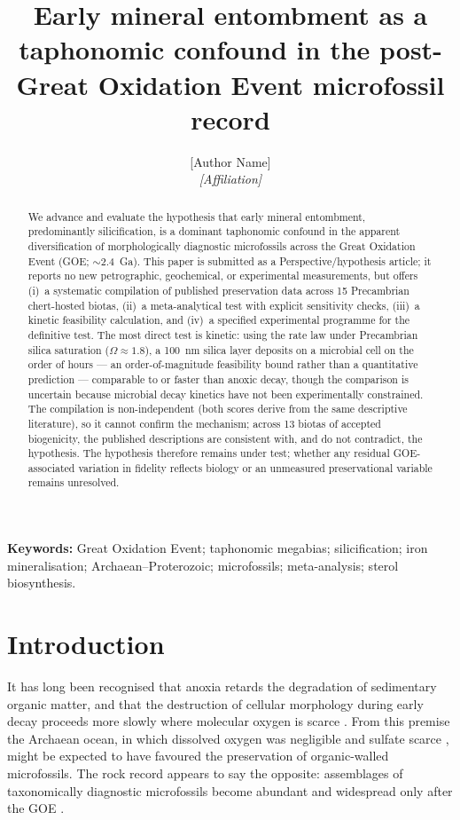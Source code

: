 \documentclass[11pt]{article}
\title{\vspace{-1.0cm}\textbf{Early mineral entombment as a taphonomic confound in the
post-Great Oxidation Event microfossil record}}
\author{[Author Name]\\
\small\textit{[Affiliation]}}
\date{}
\begin{document}
\maketitle

\begin{abstract}
\noindent We advance and evaluate the hypothesis that early mineral entombment, predominantly
silicification, is a dominant taphonomic confound in the apparent diversification of morphologically
diagnostic microfossils across the Great Oxidation Event (GOE; $\sim$2.4~Ga). This paper is submitted
as a Perspective/hypothesis article; it reports no new petrographic, geochemical, or experimental
measurements, but offers (i)~a systematic compilation of published preservation data across 15
Precambrian chert-hosted biotas, (ii)~a meta-analytical test with explicit sensitivity checks,
(iii)~a kinetic feasibility calculation, and (iv)~a specified experimental programme for the
definitive test. The most direct test is kinetic: using the \citet{Rimstidt1980} rate law under
Precambrian silica saturation ($\Omega \approx 1.8$), a 100~nm silica layer deposits on a microbial
cell on the order of hours --- an order-of-magnitude feasibility bound rather than a quantitative
prediction --- comparable to or faster than anoxic decay, though the comparison is uncertain because
microbial decay kinetics have not been experimentally constrained. The compilation is non-independent
(both scores derive from the same descriptive literature), so it cannot confirm the mechanism; across
13 biotas of accepted biogenicity, the published descriptions are consistent with, and do not
contradict, the hypothesis. The hypothesis therefore remains under test; whether any residual
GOE-associated variation in fidelity reflects biology or an unmeasured preservational variable remains
unresolved.
\end{abstract}

\noindent\textbf{Keywords:} Great Oxidation Event; taphonomic megabias; silicification; iron
mineralisation; Archaean--Proterozoic; microfossils; meta-analysis; sterol biosynthesis.

\section{Introduction}

It has long been recognised that anoxia retards the degradation of sedimentary organic matter, and
that the destruction of cellular morphology during early decay proceeds more slowly where molecular
oxygen is scarce \citep{Canfield1994,Hedges1995}. From this premise the Archaean ocean, in which
dissolved oxygen was negligible \citep{Pavlov2002} and sulfate scarce \citep{Habicht2002,Crowe2014},
might be expected to have favoured the preservation of organic-walled microfossils. The rock record
appears to say the opposite: assemblages of taxonomically diagnostic microfossils become abundant
and widespread only after the GOE \citep{Javaux2018,Wacey2014}.
\end{document}

